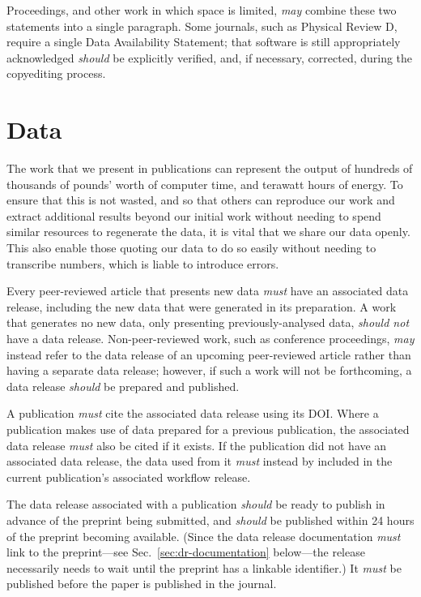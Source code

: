 \documentclass{article}
\newcommand\rfcword[1]{\emph{#1}\xspace}
\newcommand\must{\rfcword{must}}
\newcommand\should{\rfcword{should}}
\newcommand\shouldnot{\rfcword{should not}}
\newcommand\may{\rfcword{may}}
\begin{document}
Proceedings,
and other work in which space is limited,
\may combine these two statements into a single paragraph.
Some journals,
such as Physical Review D,
require a single Data Availability Statement;
that software is still appropriately acknowledged
\should be explicitly verified,
and, if necessary, corrected,
during the copyediting process.

\section{Data}\label{sec:data}

The work that we present in publications can represent
the output of hundreds of thousands of pounds' worth of computer time,
and terawatt hours of energy.
To ensure that this is not wasted,
and so that others can reproduce our work
and extract additional results beyond our initial work
without needing to spend similar resources to regenerate the data,
it is vital that we share our data openly.
This also enable those quoting our data to do so easily
without needing to transcribe numbers,
which is liable to introduce errors.

Every peer-reviewed article that presents new data
\must have an associated data release,
including the new data that were generated in its preparation.
A work that generates no new data,
only presenting previously-analysed data,
\shouldnot have a data release.
Non-peer-reviewed work,
such as conference proceedings,
\may instead refer to
the data release of an upcoming peer-reviewed article
rather than having a separate data release;
however,
if such a work will not be forthcoming,
a data release \should be prepared and published.

A publication \must cite the associated data release using its DOI\@.
Where a publication makes use of data prepared for a previous publication,
the associated data release \must also be cited if it exists.
If the publication did not have an associated data release,
the data used from it \must instead by included in
the current publication's associated workflow release.

The data release associated with a publication
\should be ready to publish in advance of the preprint being submitted,
and \should be published within 24 hours of the preprint becoming available.
(Since the data release documentation
\must link to the preprint---see Sec.~\ref{sec:dr-documentation} below---the release
necessarily needs to wait until the preprint has a linkable identifier.)
It \must be published before the paper is published in the journal.
\end{document}
